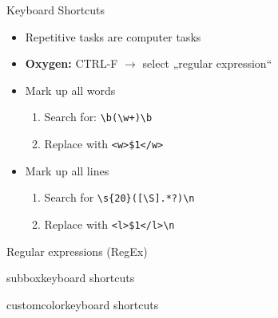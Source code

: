 

\begin{frame}[fragile]{Keyboard Shortcuts}
    
\begin{itemize}
    \item Repetitive tasks are computer tasks
    \item \textbf{Oxygen:} CTRL-F $\to$ select „regular expression“
    \item Mark up all words
    \begin{enumerate}
        \item Search for: \verb|\b(\w+)\b|
        \item Replace with \verb|<w>$1</w>|
    \end{enumerate}
    \item Mark up all lines
    \begin{enumerate}
        \item Search for \verb|\s{20}([\S].*?)\n|
        \item Replace with \verb|<l>$1</l>\n|
    \end{enumerate}
\end{itemize}
\end{frame}


\begin{frame}{Regular expressions (RegEx)}
 \begin{multibox}{2} %
\begin{subbox}{subbox}{keyboard shortcuts}\footnotesize



\end{subbox}
\begin{subbox}{customcolor}{keyboard shortcuts}\footnotesize


\end{subbox}
\end{multibox}
\end{frame}





